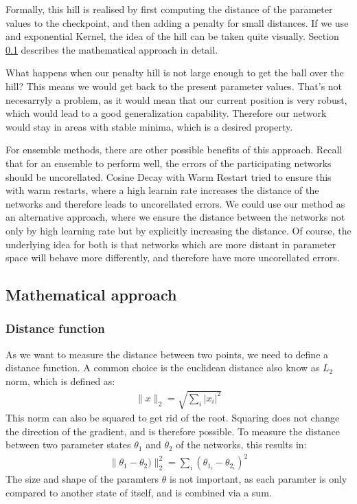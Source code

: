 Formally, this hill is realised by first computing the distance of the parameter
values to the checkpoint, and then adding a penalty for small distances. If we
use and exponential Kernel, the idea of the hill can be taken quite visually.
Section \ref{sub:Mathematical_approach} describes the mathematical approach in
detail.

What happens when our penalty hill is not large enough to get the ball over the
hill? This means we would get back to the present parameter values. That's not
necesarryly a problem, as it would mean that our current position is very
robust, which would lead to a good generalization capability. Therefore our
network would stay in areas with stable minima, which is a desired property.

For ensemble methods, there are other possible benefits of this approach. Recall
that for an ensemble to perform well, the errors of the participating networks
should be uncorellated. Cosine Decay with Warm Restart \cite{loshchilov2016sgdr} tried to
ensure this with warm restarts, where a high learnin rate increases the distance
of the networks and therefore leads to uncorellated errors. We could use our
method as an alternative approach, where we ensure the distance between the
networks not only by high learning rate but by explicitly increasing the
distance. Of course, the underlying idea for both is that networks which are
more distant in parameter space will behave more differently, and therefore have
more uncorellated errors.



\subsection{Mathematical approach}\label{sub:Mathematical_approach}
\subsubsection{Distance function}\label{distance_function}
As we want to measure the distance between two points, we need to define a
distance function. A common choice is the euclidean distance also know as $L_2$
norm, which is defined as: 
\begin{align}
    \rVert x \lVert_2 = \sqrt{\sum_i \lvert x_i \rvert^2}
\end{align}
This norm can also be squared to get rid of the root. Squaring does not change
the direction of the gradient, and is therefore possible. To measure the
distance between two parameter states $\theta_1$ and $\theta_2$ of the networks,
this results in:
\begin{align}\label{eq:distance}
    \rVert\theta_1 - \theta_2)\lVert_2^2= \sum_i (\theta_{1_i}-\theta_{2_i})^2
\end{align}
The size and shape of the paramters $\theta$ is not important, as each paramter
is only compared to another state of itself, and is combined via a sum.

